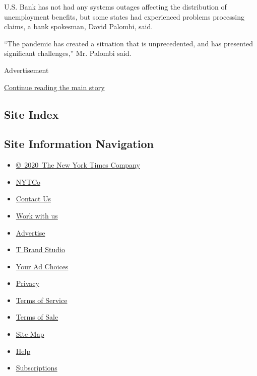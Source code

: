 U.S. Bank has not had any systems outages affecting the distribution of
unemployment benefits, but some states had experienced problems
processing claims, a bank spokesman, David Palombi, said.

``The pandemic has created a situation that is unprecedented, and has
presented significant challenges,'' Mr. Palombi said.

Advertisement

\protect\hyperlink{after-bottom}{Continue reading the main story}

\hypertarget{site-index}{%
\subsection{Site Index}\label{site-index}}

\hypertarget{site-information-navigation}{%
\subsection{Site Information
Navigation}\label{site-information-navigation}}

\begin{itemize}
\tightlist
\item
  \href{https://help.nytimes3xbfgragh.onion/hc/en-us/articles/115014792127-Copyright-notice}{©~2020~The
  New York Times Company}
\end{itemize}

\begin{itemize}
\tightlist
\item
  \href{https://www.nytco.com/}{NYTCo}
\item
  \href{https://help.nytimes3xbfgragh.onion/hc/en-us/articles/115015385887-Contact-Us}{Contact
  Us}
\item
  \href{https://www.nytco.com/careers/}{Work with us}
\item
  \href{https://nytmediakit.com/}{Advertise}
\item
  \href{http://www.tbrandstudio.com/}{T Brand Studio}
\item
  \href{https://www.nytimes3xbfgragh.onion/privacy/cookie-policy\#how-do-i-manage-trackers}{Your
  Ad Choices}
\item
  \href{https://www.nytimes3xbfgragh.onion/privacy}{Privacy}
\item
  \href{https://help.nytimes3xbfgragh.onion/hc/en-us/articles/115014893428-Terms-of-service}{Terms
  of Service}
\item
  \href{https://help.nytimes3xbfgragh.onion/hc/en-us/articles/115014893968-Terms-of-sale}{Terms
  of Sale}
\item
  \href{https://spiderbites.nytimes3xbfgragh.onion}{Site Map}
\item
  \href{https://help.nytimes3xbfgragh.onion/hc/en-us}{Help}
\item
  \href{https://www.nytimes3xbfgragh.onion/subscription?campaignId=37WXW}{Subscriptions}
\end{itemize}
